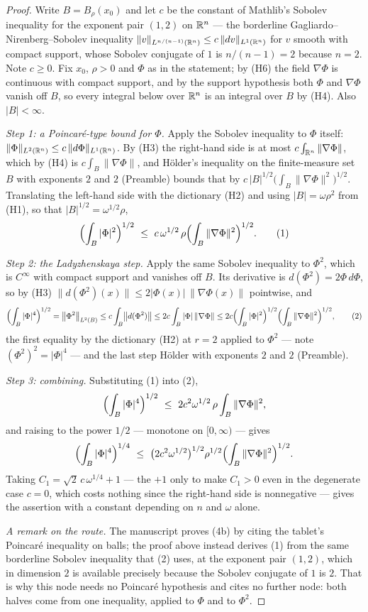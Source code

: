 \begin{proof}
Write $B=B_\rho(x_0)$ and let $c$ be the constant of Mathlib's Sobolev
inequality for the exponent pair $(1,2)$ on $\mathbb{R}^n$ --- the borderline
Gagliardo--Nirenberg--Sobolev inequality
$\|v\|_{L^{n/(n-1)}(\mathbb{R}^n)}\le c\,\|dv\|_{L^1(\mathbb{R}^n)}$ for $v$ smooth with
compact support, whose Sobolev conjugate of $1$ is $n/(n-1)=2$ because $n=2$.
Note $c\ge0$.  Fix $x_0$, $\rho>0$ and $\Phi$ as in the statement; by (H6) the
field $\nabla\Phi$ is continuous with compact support, and by the support
hypothesis both $\Phi$ and $\nabla\Phi$ vanish off $B$, so every integral below
over $\mathbb{R}^n$ is an integral over $B$ by (H4).  Also $|B|<\infty$.

\emph{Step 1: a Poincaré-type bound for $\Phi$.}  Apply the Sobolev inequality
to $\Phi$ itself: $\|\Phi\|_{L^2(\mathbb{R}^n)}\le c\,\|d\Phi\|_{L^1(\mathbb{R}^n)}$.  By (H3)
the right-hand side is at most $c\int_{\mathbb{R}^n}\|\nabla\Phi\|$, which by (H4) is
$c\int_B\|\nabla\Phi\|$, and Hölder's inequality on the finite-measure set $B$
with exponents $2$ and $2$ (Preamble) bounds that by
$c\,|B|^{1/2}\bigl(\int_B\|\nabla\Phi\|^{2}\bigr)^{1/2}$.  Translating the
left-hand side with the dictionary (H2) and using $|B|=\omega\rho^{2}$ from
(H1), so that $|B|^{1/2}=\omega^{1/2}\rho$,
\[
\Bigl(\int_B|\Phi|^{2}\Bigr)^{1/2}
\ \le\ c\,\omega^{1/2}\,\rho\Bigl(\int_B\|\nabla\Phi\|^{2}\Bigr)^{1/2}.
\tag{1}
\]

\emph{Step 2: the Ladyzhenskaya step.}  Apply the same Sobolev inequality to
$\Phi^{2}$, which is $C^\infty$ with compact support and vanishes off $B$.  Its
derivative is $d(\Phi^2)=2\Phi\,d\Phi$, so by (H3)
$\|d(\Phi^2)(x)\|\le2|\Phi(x)|\,\|\nabla\Phi(x)\|$ pointwise, and
\[
\Bigl(\int_B|\Phi|^{4}\Bigr)^{1/2}
=\bigl\|\Phi^{2}\bigr\|_{L^{2}(B)}
\le c\int_B\bigl\|d(\Phi^{2})\bigr\|
\le2c\int_B|\Phi|\,\|\nabla\Phi\|
\le2c\Bigl(\int_B|\Phi|^{2}\Bigr)^{1/2}
   \Bigl(\int_B\|\nabla\Phi\|^{2}\Bigr)^{1/2},
\tag{2}
\]
the first equality by the dictionary (H2) at $r=2$ applied to $\Phi^2$ --- note
$(\Phi^2)^2=|\Phi|^4$ --- and the last step Hölder with exponents $2$ and $2$
(Preamble).

\emph{Step 3: combining.}  Substituting (1) into (2),
\[
\Bigl(\int_B|\Phi|^{4}\Bigr)^{1/2}
\ \le\ 2c^{2}\omega^{1/2}\,\rho\int_B\|\nabla\Phi\|^{2},
\]
and raising to the power $1/2$ --- monotone on $[0,\infty)$ --- gives
\[
\Bigl(\int_B|\Phi|^{4}\Bigr)^{1/4}
\ \le\ \bigl(2c^{2}\omega^{1/2}\bigr)^{1/2}\rho^{1/2}
  \Bigl(\int_B\|\nabla\Phi\|^{2}\Bigr)^{1/2}.
\]
Taking $C_1=\sqrt2\,c\,\omega^{1/4}+1$ --- the $+1$ only to make $C_1>0$ even
in the degenerate case $c=0$, which costs nothing since the right-hand side is
nonnegative --- gives the assertion with a constant depending on $n$ and
$\omega$ alone.

\emph{A remark on the route.}  The manuscript proves (4b) by citing the
tablet's Poincaré inequality on balls; the proof above instead derives (1) from
the same borderline Sobolev inequality that (2) uses, at the exponent pair
$(1,2)$, which in dimension $2$ is available precisely because the Sobolev
conjugate of $1$ is $2$.  That is why this node needs no Poincaré hypothesis
and cites no further node: both halves come from one inequality, applied to
$\Phi$ and to $\Phi^{2}$.
\end{proof}
